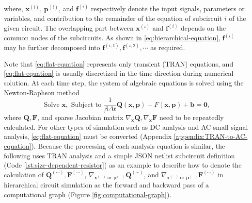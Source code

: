 where, $\bm{x}^{(i)}$, $\bm{p}^{(i)}$, and $\bm{f}^{(i)}$ respectively denote the input signals, parameters or variables, and contribution to the remainder of the equation of subcircuit $i$ of the given circuit. The overlapping part between $\bm{x}^{(i)}$ and $\bm{f}^{(i)}$ depends on the common nodes of the subcircuits. As shown in \ref{eq:hierarchical-equation}, $\bm{f}^{(i)}$ may be further decomposed into $\bm{f}^{(i,1)},\bm{f}^{(i,2)},\cdots$ as required.

Note that \ref{eq:flat-equation} represents only transient (TRAN) equations, and \ref{eq:flat-equation} is usually discretized in the time direction during numerical solution. At each time step, the system of algebraic equations is solved using the Newton-Raphson method
\cite[Section 7.1]{fijnvandraat2002time}
\[
\text{ Solve }\bm{x},\text{ Subject to }
\frac{1}{\beta\Delta t}\bm{Q}(\bm{x},\bm{p})+F(\bm{x},\bm{p})+\bm{b}=\bm{0},
\]
where $\bm{Q},\bm{F}$, and sparse Jacobian matrix $\nabla_{\bm{x}}\bm{Q},\nabla_{\bm{x}}\bm{F}$ need to be repeatedly calculated. For other types of simulation such as DC analysis and AC small signal analysis, \ref{eq:flat-equation} must be converted (Appendix \ref{appendix:TRAN-to-AC-equation}). Because the processing of each analysis equation is similar, the following uses TRAN analysis and a simple JSON netlist subcircuit definition (Code \ref{lst:size-dependent-resistor}) as an example to describe how to denote the calculation of $\bm{Q}^{(\cdots)},\bm{F}^{(\cdots)}$, $\nabla_{\bm{x}^{(\cdots)}\text{ or }\bm{p}^{(\cdots)}}\bm{Q}^{(\cdots)}$, and $\nabla_{\bm{x}^{(\cdots)}\text{ or }\bm{p}^{(\cdots)}}\bm{F}^{(\cdots)}$ in hierarchical circuit simulation as the forward and backward pass of a computational graph (Figure \ref{fig:computational-graph}).

